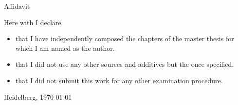 
{\Large  Affidavit}  
\vspace*{0.5\baselineskip}

{\Large  Here with I declare:}  

\begin{itemize}
    \item that I have independently composed the chapters of the master thesis for which I am named as the author.
    \item that I did not use any other sources and additives but the once specified. 
    \item that I did not submit this work for any other examination procedure. 
\end{itemize}


\vspace*{5\baselineskip}


Heidelberg, \today \hspace*{1mm} \hrulefill
